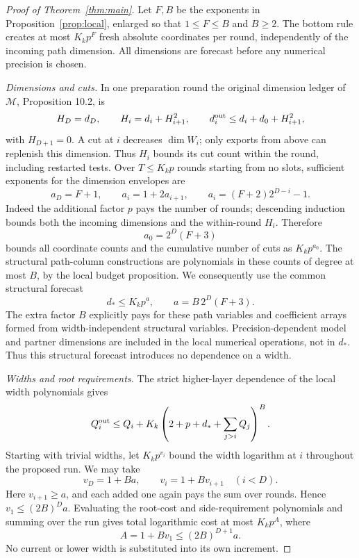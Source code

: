 \documentclass[11pt,a4paper]{article}
\theoremstyle{definition}
\newcommand{\M}{\mathcal M}
\begin{document}
\begin{proof}[Proof of Theorem~\ref{thm:main}]
Let \(F,B\) be the exponents in Proposition~\ref{prop:local}, enlarged
so that \(1\le F\le B\) and \(B\ge2\). The bottom rule creates at
most \(K_kp^F\) fresh absolute coordinates per round, independently
of the incoming path dimension. All dimensions are forecast before
any numerical precision is chosen.

\textit{Dimensions and cuts.}
In one preparation round the original dimension ledger of \(\M\),
Proposition 10.2, is
\[
 H_D=d_D,\qquad H_i=d_i+H_{i+1}^2,\qquad
 d_i^{\rm out}\le d_i+d_0+H_{i+1}^2,
\]
with \(H_{D+1}=0\). A cut at \(i\) decreases \(\dim W_i\);
only exports from above can replenish this dimension. Thus \(H_i\)
bounds its cut count within the round, including restarted tests.
Over \(T\le K_kp\) rounds starting from no slots, sufficient
exponents for the dimension envelopes are
\[
 a_D=F+1,\qquad a_i=1+2a_{i+1},\qquad
 a_i=(F+2)2^{D-i}-1.
\]
Indeed the additional factor \(p\) pays the number of rounds;
descending induction bounds both the incoming dimensions and the
within-round \(H_i\). Therefore
\[
 a_0=2^D(F+3)
\]
bounds all coordinate counts and the cumulative number of cuts as
\(K_kp^{a_0}\). The structural path-column constructions are
polynomials in these counts of degree at most \(B\), by the local
budget proposition. We consequently use the common structural forecast
\begin{equation}\label{eq:structural-a}
 d_*\le K_kp^a,\qquad a=B\,2^D(F+3).
\end{equation}
The extra factor \(B\) explicitly pays for these path variables and
coefficient arrays formed from width-independent structural variables.
Precision-dependent model and partner dimensions are included in the
local numerical operations, not in \(d_*\). Thus this structural
forecast introduces no dependence on a width.

\textit{Widths and root requirements.}
The strict higher-layer dependence of the local width polynomials gives
\[
 Q_i^{\rm out}\le Q_i+
 K_k\left(2+p+d_*+\sum_{j>i}Q_j\right)^B.
\]
Starting with trivial widths, let \(K_kp^{v_i}\) bound the width
logarithm at \(i\) throughout the proposed run. We may take
\begin{equation}\label{eq:v-rec}
 v_D=1+Ba,\qquad v_i=1+Bv_{i+1}\quad(i<D).
\end{equation}
Here \(v_{i+1}\ge a\), and each added one again pays the sum over
rounds. Hence \(v_1\le(2B)^Da\). Evaluating the root-cost and
side-requirement polynomials and summing over the run gives total
logarithmic cost at most \(K_kp^A\), where
\begin{equation}\label{eq:A}
 A=1+Bv_1\le(2B)^{D+1}a.
\end{equation}
No current or lower width is substituted into its own increment.


\end{proof}
\end{document}
